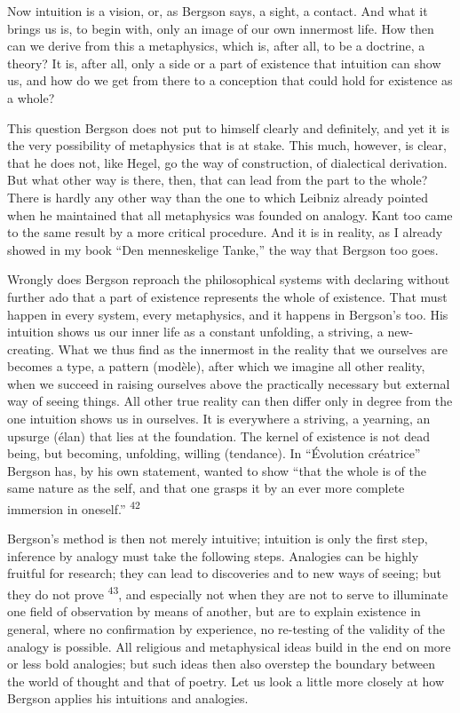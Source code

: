 \documentclass[12pt,a4paper,openany]{book}
\newcommand{\opage}[1]{\marginnote{\footnotesize\textit{[#1]}}}
\newcommand{\nm}[1]{\unskip\textsuperscript{#1}}
\begin{document}
Now intuition is a vision, or, as Bergson says, a sight, a contact. And what it brings us is, to begin with, only an image of our own innermost life. How then can we derive from this a metaphysics, which is, after all, to be a doctrine, a theory? It is, after all, only a side or a part of existence that intuition can show us, and how do we get from there to a conception that could hold for existence as a whole?

This question Bergson does not put to himself clearly and definitely, and yet it is the very possibility of metaphysics that is at stake. This much, however, is clear, that he does not, like Hegel, go
\opage{54}the way of construction, of dialectical derivation. But what other way is there, then, that can lead from the part to the whole? There is hardly any other way than the one to which Leibniz already pointed when he maintained that all metaphysics was founded on analogy. Kant too came to the same result by a more critical procedure. And it is in reality, as I already showed in my book ``Den menneskelige Tanke,'' the way that Bergson too goes.

Wrongly does Bergson reproach the philosophical systems with declaring without further ado that a part of existence represents the whole of existence. That must happen in every system, every metaphysics, and it happens in Bergson's too. His intuition shows us our inner life as a constant unfolding, a striving, a new-creating. What we thus find as the innermost in the reality that we ourselves are becomes a type, a pattern (modèle), after which we imagine all other reality, when we succeed in raising ourselves above the practically necessary but external way of seeing things. All other true reality can then differ only in degree from the one intuition shows us in ourselves. It is everywhere a striving, a yearning, an upsurge (élan) that lies at the foundation. The kernel of existence is not dead being, but becoming, unfolding, willing (tendance). In ``Évolution créatrice'' Bergson has, by his own statement, wanted to show ``that the whole is of the same nature as the self, and that one grasps it by an ever more complete immersion in oneself.'' \nm{42}

Bergson's method is then not merely intuitive; intuition is only the first step, inference by analogy must take the following steps. Analogies can be highly fruitful for research; they can lead to discoveries and to new ways of seeing; but they do not prove \nm{43}, and especially not when they are not to serve to illuminate one field of observation by means of another, but are to explain existence in general, where no confirmation by experience, no re-testing of the validity of the analogy is possible. All religious and metaphysical ideas build in the end on more or less bold analogies; but such ideas then also overstep the boundary between the world of thought and that of poetry.
\opage{55}Let us look a little more closely at how Bergson applies his intuitions and analogies.
\end{document}
